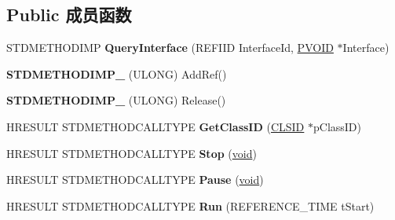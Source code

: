\subsection*{Public 成员函数}
\begin{DoxyCompactItemize}
\item 
\mbox{\label{class_c_network_provider_a19f4795cac515baf0545b3a5be7a7345}} 
S\+T\+D\+M\+E\+T\+H\+O\+D\+I\+MP {\bfseries Query\+Interface} (R\+E\+F\+I\+ID Interface\+Id, \hyperlink{interfacevoid}{P\+V\+O\+ID} $\ast$Interface)
\item 
\mbox{\label{class_c_network_provider_ab1a2e74fa735aad240e6acab6b75288a}} 
{\bfseries S\+T\+D\+M\+E\+T\+H\+O\+D\+I\+M\+P\+\_\+} (U\+L\+O\+NG) Add\+Ref()
\item 
\mbox{\label{class_c_network_provider_a89cb307f5e357d4d2c80f7d87d8364dc}} 
{\bfseries S\+T\+D\+M\+E\+T\+H\+O\+D\+I\+M\+P\+\_\+} (U\+L\+O\+NG) Release()
\item 
\mbox{\label{class_c_network_provider_a11cbbe82b30f7ad28f089b690a280c00}} 
H\+R\+E\+S\+U\+LT S\+T\+D\+M\+E\+T\+H\+O\+D\+C\+A\+L\+L\+T\+Y\+PE {\bfseries Get\+Class\+ID} (\hyperlink{struct___i_i_d}{C\+L\+S\+ID} $\ast$p\+Class\+ID)
\item 
\mbox{\label{class_c_network_provider_a046990ed74261169fc29b7a3eacab20c}} 
H\+R\+E\+S\+U\+LT S\+T\+D\+M\+E\+T\+H\+O\+D\+C\+A\+L\+L\+T\+Y\+PE {\bfseries Stop} (\hyperlink{interfacevoid}{void})
\item 
\mbox{\label{class_c_network_provider_a22065e9116d1a0a227ddff9c98083bfd}} 
H\+R\+E\+S\+U\+LT S\+T\+D\+M\+E\+T\+H\+O\+D\+C\+A\+L\+L\+T\+Y\+PE {\bfseries Pause} (\hyperlink{interfacevoid}{void})
\item 
\mbox{\label{class_c_network_provider_a416ed682f0e7073d2e9aa97f6a70f917}} 
H\+R\+E\+S\+U\+LT S\+T\+D\+M\+E\+T\+H\+O\+D\+C\+A\+L\+L\+T\+Y\+PE {\bfseries Run} (R\+E\+F\+E\+R\+E\+N\+C\+E\+\_\+\+T\+I\+ME t\+Start)
\item 
\mbox{\label{class_c_network_provider_abd880c645b75243bd8bb66bb5c000d7f}} 

\end{DoxyCompactItemize}
